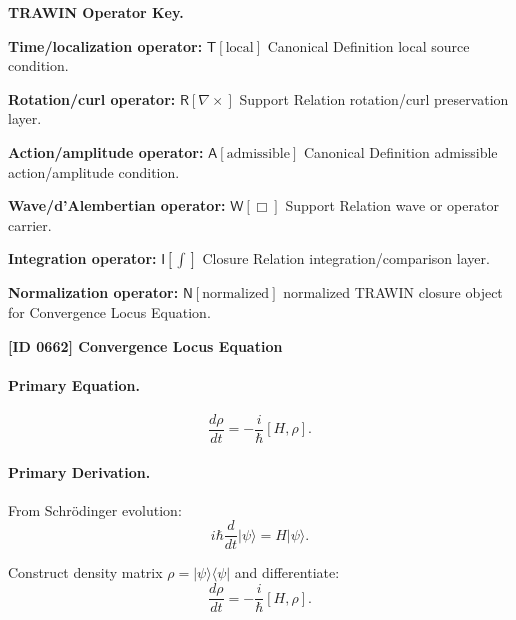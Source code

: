 \par\vspace{0.45\baselineskip}
\noindent\begin{minipage}[t]{\linewidth}
\begingroup
\small
\raggedright
\textbf{TRAWIN Operator Key.}\par
\noindent\textbf{Time/localization operator:} $\mathsf{T}\!\left[\mathrm{local}\right]$ Canonical Definition local source condition.\par
\noindent\textbf{Rotation/curl operator:} $\mathsf{R}\!\left[\nabla\times\right]$ Support Relation rotation/curl preservation layer.\par
\noindent\textbf{Action/amplitude operator:} $\mathsf{A}\!\left[\mathrm{admissible}\right]$ Canonical Definition admissible action/amplitude condition.\par
\noindent\textbf{Wave/d'Alembertian operator:} $\mathsf{W}\!\left[\Box\right]$ Support Relation wave or operator carrier.\par
\noindent\textbf{Integration operator:} $\mathsf{I}\!\left[\int\right]$ Closure Relation integration/comparison layer.\par
\noindent\textbf{Normalization operator:} $\mathsf{N}\!\left[\mathrm{normalized}\right]$ normalized TRAWIN closure object for Convergence Locus Equation.\par
\endgroup
\end{minipage}

\clearpage
\noindent\textbf{[ID 0662] Convergence Locus Equation}\par
\vspace{0.35em}
\paragraph{Primary Equation.}
\begin{equation}
\frac{d\rho}{dt} = -\frac{i}{\hbar}[H,\rho].
\end{equation}

\paragraph{Primary Derivation.}
From Schrödinger evolution:
\begin{equation}
i\hbar \frac{d}{dt}|\psi\rangle = H|\psi\rangle.
\end{equation}

Construct density matrix $\rho = |\psi\rangle\langle \psi|$ and differentiate:
\begin{equation}
\frac{d\rho}{dt} = -\frac{i}{\hbar}[H,\rho].
\end{equation}

